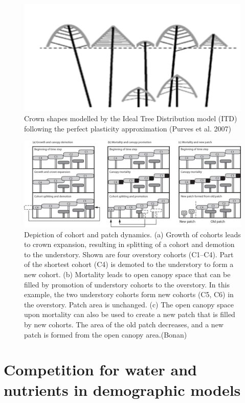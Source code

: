 \documentclass[12pt,oneside]{book}
\begin{document}
\begin{figure}

{\centering \includegraphics[width=0.8\linewidth]{figures/chap6/f629_ppa_purves} 

}

\caption{Crown shapes modelled by the Ideal Tree Distribution model (ITD) following the perfect plasticity approximation (Purves et al. 2007)}\label{fig:f629}
\end{figure}

\begin{figure}

{\centering \includegraphics[width=0.8\linewidth]{figures/chap6/f630_canopy_dynamics} 

}

\caption{Depiction of cohort and patch dynamics. (a) Growth of cohorts leads to crown expansion, resulting in splitting of a cohort and demotion to the understory. Shown are four overstory cohorts (C1–C4). Part of the shortest cohort (C4) is demoted to the understory to form a new cohort. (b) Mortality leads to open canopy space that can be filled by promotion of understory cohorts to the overstory. In this example, the two understory cohorts form new cohorts (C5, C6) in the overstory. Patch area is unchanged. (c) The open canopy space upon mortality can also be used to create a new patch that is filled by new cohorts. The area of the old patch decreases, and a new patch is formed from the open canopy area.(Bonan)}\label{fig:f630}
\end{figure}

\section{Competition for water and nutrients in demographic
models}\label{competition-for-water-and-nutrients-in-demographic-models}
\end{document}
